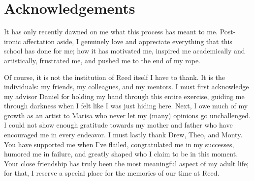     \chapter*{Acknowledgements}
    
It has only recently dawned on me what this process has meant to me. Post-ironic affectation aside, I genuinely love and appreciate everything that this school has done for me; how it has motivated me, inspired me academically and artistically, frustrated me, and pushed me to the end of my rope.

Of course, it is not the institution of Reed itself I have to thank. It is the individuals: my friends, my colleagues, and my mentors. I must first acknowledge my advisor Daniel for holding my hand through this entire exercise, guiding me through darkness when I felt like I was just hiding here. Next, I owe much of my growth as an artist to Marisa who never let my (many) opinions go unchallenged. I could not show enough gratitude towards my mother and father who have encouraged me in every endeavor. I must lastly thank Drew, Theo, and Monty. You have supported me when I've flailed, congratulated me in my successes, humored me in failure, and greatly shaped who I claim to be in this moment. Your close friendship has truly been the most meaningful aspect of my adult life; for that, I reserve a special place for the memories of our time at Reed.